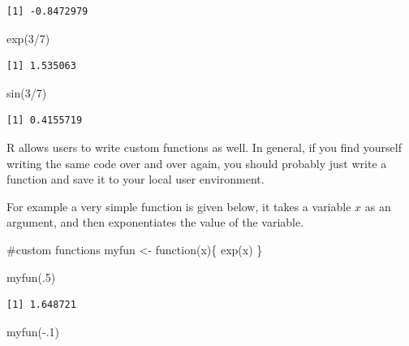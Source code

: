 \documentclass[
  letterpaper,
  DIV=11,
  numbers=noendperiod]{scrreprt}
\newenvironment{Shaded}{\begin{snugshade}}{\end{snugshade}}
\newcommand{\CommentTok}[1]{\textcolor[rgb]{0.37,0.37,0.37}{#1}}
\newcommand{\ControlFlowTok}[1]{\textcolor[rgb]{0.00,0.23,0.31}{#1}}
\newcommand{\DecValTok}[1]{\textcolor[rgb]{0.68,0.00,0.00}{#1}}
\newcommand{\FunctionTok}[1]{\textcolor[rgb]{0.28,0.35,0.67}{#1}}
\newcommand{\NormalTok}[1]{\textcolor[rgb]{0.00,0.23,0.31}{#1}}
\newcommand{\OtherTok}[1]{\textcolor[rgb]{0.00,0.23,0.31}{#1}}
\newcommand{\SpecialCharTok}[1]{\textcolor[rgb]{0.37,0.37,0.37}{#1}}
\begin{document}
\begin{verbatim}
[1] -0.8472979
\end{verbatim}

\begin{Shaded}
\begin{Highlighting}[]
\FunctionTok{exp}\NormalTok{(}\DecValTok{3}\SpecialCharTok{/}\DecValTok{7}\NormalTok{)}
\end{Highlighting}
\end{Shaded}

\begin{verbatim}
[1] 1.535063
\end{verbatim}

\begin{Shaded}
\begin{Highlighting}[]
\FunctionTok{sin}\NormalTok{(}\DecValTok{3}\SpecialCharTok{/}\DecValTok{7}\NormalTok{)}
\end{Highlighting}
\end{Shaded}

\begin{verbatim}
[1] 0.4155719
\end{verbatim}

R allows users to write custom functions as well. In general, if you
find yourself writing the same code over and over again, you should
probably just write a function and save it to your local user
environment.

For example a very simple function is given below, it takes a variable
\(x\) as an argument, and then exponentiates the value of the variable.

\begin{Shaded}
\begin{Highlighting}[]
\CommentTok{\#custom functions}
\NormalTok{myfun }\OtherTok{\textless{}{-}} \ControlFlowTok{function}\NormalTok{(x)\{}
  \FunctionTok{exp}\NormalTok{(x)}
\NormalTok{\}}

\FunctionTok{myfun}\NormalTok{(.}\DecValTok{5}\NormalTok{)}
\end{Highlighting}
\end{Shaded}

\begin{verbatim}
[1] 1.648721
\end{verbatim}

\begin{Shaded}
\begin{Highlighting}[]
\FunctionTok{myfun}\NormalTok{(}\SpecialCharTok{{-}}\NormalTok{.}\DecValTok{1}\NormalTok{)}
\end{Highlighting}
\end{Shaded}
\end{document}
